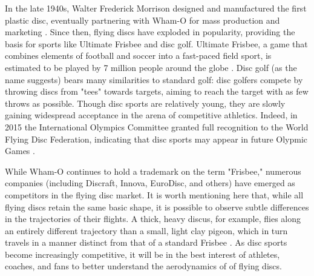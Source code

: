\documentclass[a4paper,12pt, oneside]{article}
\begin{document}
In the late 1940s, Walter Frederick Morrison designed and manufactured the first plastic disc, eventually partnering with Wham-O for mass production and marketing \cite{frisorigins}. Since then, flying discs have exploded in popularity, providing the basis for sports like Ultimate Frisbee and disc golf. Ultimate Frisbee, a game that combines elements of football and soccer into a fast-paced field sport, is estimated to be played by 7 million people around the globe \cite{frisstats}.  Disc golf (as the name suggests) bears many similarities to standard golf: disc golfers compete by throwing discs from "tees" towards targets, aiming to reach the target with as few throws as possible. Though disc sports are relatively young, they are slowly gaining widespread acceptance in the arena of competitive athletics. Indeed, in 2015 the International Olympics Committee granted full recognition to the World Flying Disc Federation, indicating that disc sports may appear in future Olypmic Games \cite{iocrecognition}.

While Wham-O continues to hold a trademark on the term "Frisbee," numerous companies (including Discraft, Innova, EuroDisc, and others) have emerged as competitors in the flying disc market. It is worth mentioning here that, while all flying discs retain the same basic shape, it is possible to observe subtle differences in the trajectories of their flights.  A thick, heavy discus, for example, flies along an entirely different trajectory than a small, light clay pigeon, which in turn travels in a manner distinct from that of a standard Frisbee \cite{pottsandcrowther2007}. As disc sports become increasingly competitive, it will be in the best interest of athletes, coaches, and fans to better understand the aerodynamics of of flying discs.
\end{document}
